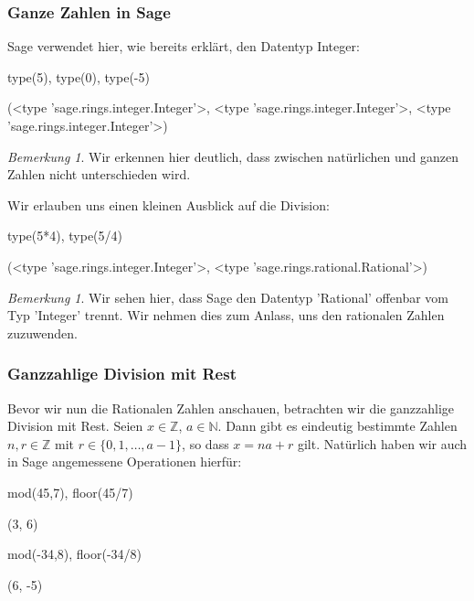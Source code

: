 \documentclass[fontsize=12pt,paper=a4,twoside,bibtotoc,idxtotoc,
liststotoc,pagesize,BCOR1.2cm,DIV15,chapterprefix,pagesize=pdftex]{scrbook}
\theoremstyle{plain}
\theoremstyle{definition}
\theoremstyle{remark}
\newtheorem{bem}[equation]{Bemerkung}
\begin{document}
\subsubsection{Ganze Zahlen in Sage}
Sage verwendet hier, wie bereits erklärt, den Datentyp Integer:
\begin{sagein}
type(5), type(0), type(-5)
\end{sagein}
\begin{sage}
(<type 'sage.rings.integer.Integer'>, 
<type 'sage.rings.integer.Integer'>, 
<type 'sage.rings.integer.Integer'>)
\end{sage}
\begin{bem}
 Wir erkennen hier deutlich, dass zwischen natürlichen und ganzen Zahlen nicht unterschieden wird.
\end{bem}
Wir erlauben uns einen kleinen Ausblick auf die Division:
\begin{sagein}
type(5*4), type(5/4)
\end{sagein}
\begin{sage}
(<type 'sage.rings.integer.Integer'>, 
<type 'sage.rings.rational.Rational'>)
\end{sage}
\begin{bem}
 Wir sehen hier, dass Sage den Datentyp 'Rational' offenbar vom Typ 'Integer' trennt. Wir nehmen dies zum Anlass, uns den rationalen Zahlen 
zuzuwenden.
\end{bem}
\subsubsection{Ganzzahlige Division mit Rest}
Bevor wir nun die Rationalen Zahlen anschauen, betrachten wir die ganzzahlige Division mit Rest.
Seien $x \in \mathbb{Z}$, $a \in \mathbb{N}$. Dann gibt es eindeutig bestimmte Zahlen
$n,r \in \mathbb{Z}$ mit $r \in \{0,1,\dots ,a-1\}$, so dass $x=na + r$ gilt. Natürlich haben wir auch in Sage angemessene Operationen hierfür:
\begin{sagein}
mod(45,7), floor(45/7)
\end{sagein}
\begin{sage}
(3, 6)
\end{sage}
\begin{sagein}
mod(-34,8), floor(-34/8)
\end{sagein}
\begin{sage}
(6, -5)
\end{sage}
\end{document}
